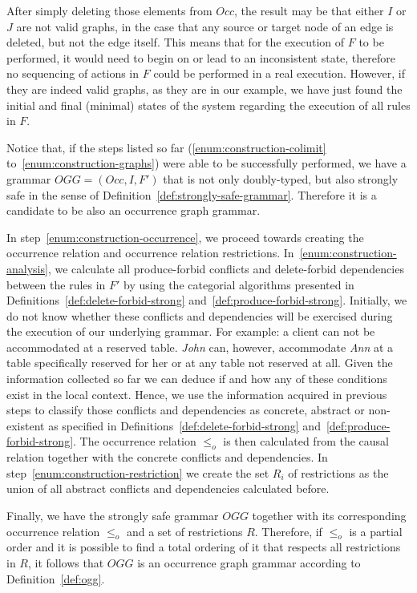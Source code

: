 After simply deleting those elements from $Occ$, the result may be that either $I$ or $J$ are not valid graphs, in the case that any source or target node of an edge is deleted, but not the edge itself. This means that for the execution of $F$ to be performed, it would need to begin on or lead to an inconsistent state, therefore no sequencing of actions in $F$ could be performed in a real execution. However, if they are indeed valid graphs, as they are in our example, we have just found the initial and final (minimal) states of the system regarding the execution of all rules in $F$.

Notice that, if the steps listed so far (\ref{enum:construction-colimit} to~\ref{enum:construction-graphs}) were able to be successfully performed, we have a grammar \mbox{$OGG = \left(Occ, I, F'\right)$} that is not only doubly-typed, but also strongly safe in the sense of Definition~\ref{def:strongly-safe-grammar}. Therefore it is a candidate to be also an occurrence graph grammar.

In step~\ref{enum:construction-occurrence}, we proceed towards creating the occurrence relation and occurrence relation restrictions. In~\ref{enum:construction-analysis}, we calculate all produce-forbid conflicts and delete-forbid dependencies between the rules in $F'$ by using the categorial algorithms presented in Definitions~\ref{def:delete-forbid-strong} and~\ref{def:produce-forbid-strong}. Initially, we do not know whether these conflicts and dependencies will be exercised during the execution of our underlying grammar. For example: a client can not be accommodated at a reserved table. \textit{John} can, however, accommodate \textit{Ann} at a table specifically reserved for her or at any table not reserved at all. Given the information collected so far we can deduce if and how any of these conditions exist in the local context. Hence, we use the information acquired in previous steps to classify those conflicts and dependencies as concrete, abstract or non-existent as specified in
Definitions~\ref{def:delete-forbid-strong} and~\ref{def:produce-forbid-strong}. The occurrence relation $\leq_o$ is then calculated from the causal relation together with the concrete conflicts and dependencies. In step~\ref{enum:construction-restriction} we create the set $R_i$ of restrictions as the union of all abstract conflicts and dependencies calculated before.

Finally, we have the strongly safe grammar $OGG$ together with its corresponding occurrence relation $\leq_o$ and a set of restrictions $R$. Therefore, if $\leq_o$ is a partial order and it is possible to find a total ordering of it that respects all restrictions in $R$, it follows that $OGG$ is an occurrence graph grammar according to Definition~\ref{def:ogg}.

